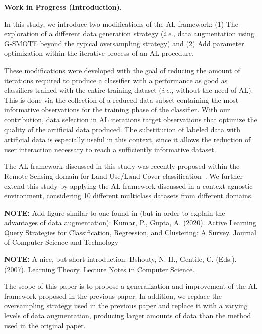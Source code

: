 \documentclass[parskip=full]{scrartcl}
\begin{document}


\textbf{Work in Progress (Introduction).}

In this study, we introduce two modifications of the AL framework: (1) The
exploration of a different data generation strategy (\textit{i.e.,} data
augmentation using G-SMOTE beyond the typical oversampling strategy) and (2)
Add parameter optimization within the iterative process of an AL procedure.

These modifications were developed with the goal of reducing the amount of
iterations required to produce a classifier with a performance as good as
classifiers trained with the entire training dataset (\textit{i.e.,} without
the need of AL). This is done via the collection of a reduced data subset
containing the most informative observations for the training phase of the
classifier. With our contribution, data selection in AL iterations target
observations that optimize the quality of the artificial data produced. The
substitution of labeled data with artificial data is especially useful in this
context, since it allows the reduction of user interaction necessary to reach
a sufficiently informative dataset.

The AL framework discussed in this study was recently proposed within the Remote
Sensing domain for Land Use/Land Cover classification~\cite{Fonseca2021}. We
further extend this study by applying the AL framework discussed in a context
agnostic environment, considering 10 different multiclass datasets from
different domains.

\textbf{NOTE:} Add figure similar to one found in (but in order to explain the
advantages of data augmentation): Kumar, P., Gupta, A. (2020). Active Learning
Query Strategies for Classification, Regression, and Clustering: A Survey.
Journal of Computer Science and Technology

\textbf{NOTE:} A nice, but short introduction: Bshouty, N. H., Gentile, C.
(Eds.). (2007). Learning Theory. Lecture Notes in Computer Science\@.

The scope of this paper is to propose a generalization and
improvement of the AL framework proposed in the previous paper. In addition,
we replace the oversampling strategy used in the previous paper and replace it
with a varying levels of data augmentation, producing larger amounts of data
than the method used in the original paper.
\end{document}

